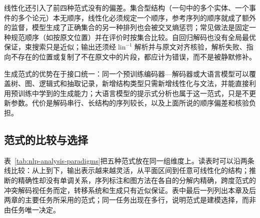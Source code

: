线性化还引入了前四种范式没有的偏差。集合型结构（一句中的多个实体、一个事件的多个论元）本无顺序，线性化必须规定一个顺序，参考序列的顺序就成了额外的监督，模型生成了正确集合的另一种排列也会被交叉熵惩罚；常见做法是固定一种规范顺序（如按原文位置）并在评价时按集合比较。自回归解码也没有全局最优保证，束搜索只是近似；输出还须经$\operatorname{lin}^{-1}$解析并与原文对齐核验，解析失败、指向不存在的位置或复制了不在原文中的片段，都应计为错误，而不是被静默修补。

生成范式的优势在于接口统一：同一个预训练编码器—解码器或大语言模型可以覆盖树、图、逻辑式和抽取记录，新增结构类型只需新增线性化与文法，并能直接利用预训练中学到的生成能力；大语言模型的提示式分析也属于这一范式，只是不更新参数。代价是解码串行、长结构的序列较长，以及上面所说的顺序偏差和核验负担。

\subsection{范式的比较与选择}
\label{sec:nlp-analysis-paradigm-comparison}

表~\ref{tab:nlp-analysis-paradigms}把五种范式放在同一组维度上。读表时可以沿两条线比较：从上到下，输出表示越来越灵活，从平面区间到任意可线性化的结构；推断的精确性却没有单调关系，序列标注和图方法在各自的分解内精确，跨度范式的冲突解码视任务而定，转移系统和生成只有近似保证。表中最后一列列出本章及后两章的主要任务所采用的范式；同一任务出现在多行，说明范式是建模选择，而非由任务唯一决定。


